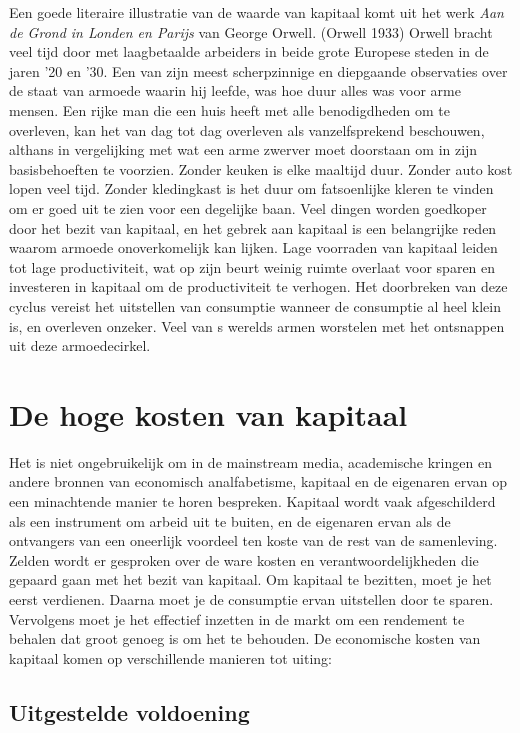 \documentclass[
  a5paper,
  smalldemyvopaper,11pt,twoside,onecolumn,openright,extrafontsizes,
hidelinks]{memoir}
\begin{document}
Een goede literaire illustratie van de waarde van kapitaal komt uit het
werk \emph{Aan de Grond in Londen en Parijs} van George Orwell. (Orwell
1933) Orwell bracht veel tijd door met laagbetaalde arbeiders in beide
grote Europese steden in de jaren '20 en '30. Een van zijn meest
scherpzinnige en diepgaande observaties over de staat van armoede waarin
hij leefde, was hoe duur alles was voor arme mensen. Een rijke man die
een huis heeft met alle benodigdheden om te overleven, kan het van dag
tot dag overleven als vanzelfsprekend beschouwen, althans in
vergelijking met wat een arme zwerver moet doorstaan om in zijn
basisbehoeften te voorzien. Zonder keuken is elke maaltijd duur. Zonder
auto kost lopen veel tijd. Zonder kledingkast is het duur om
fatsoenlijke kleren te vinden om er goed uit te zien voor een degelijke
baan. Veel dingen worden goedkoper door het bezit van kapitaal, en het
gebrek aan kapitaal is een belangrijke reden waarom armoede
onoverkomelijk kan lijken. Lage voorraden van kapitaal leiden tot lage
productiviteit, wat op zijn beurt weinig ruimte overlaat voor sparen en
investeren in kapitaal om de productiviteit te verhogen. Het doorbreken
van deze cyclus vereist het uitstellen van consumptie wanneer de
consumptie al heel klein is, en overleven onzeker. Veel van s werelds
armen worstelen met het ontsnappen uit deze armoedecirkel.

\section{De hoge kosten van kapitaal}\label{de-hoge-kosten-van-kapitaal}

Het is niet ongebruikelijk om in de mainstream media, academische
kringen en andere bronnen van economisch analfabetisme, kapitaal en de
eigenaren ervan op een minachtende manier te horen bespreken. Kapitaal
wordt vaak afgeschilderd als een instrument om arbeid uit te buiten, en
de eigenaren ervan als de ontvangers van een oneerlijk voordeel ten
koste van de rest van de samenleving. Zelden wordt er gesproken over de
ware kosten en verantwoordelijkheden die gepaard gaan met het bezit van
kapitaal. Om kapitaal te bezitten, moet je het eerst verdienen. Daarna
moet je de consumptie ervan uitstellen door te sparen. Vervolgens moet
je het effectief inzetten in de markt om een rendement te behalen dat
groot genoeg is om het te behouden. De economische kosten van kapitaal
komen op verschillende manieren tot uiting:

\subsection{Uitgestelde voldoening}\label{uitgestelde-voldoening}
\end{document}
